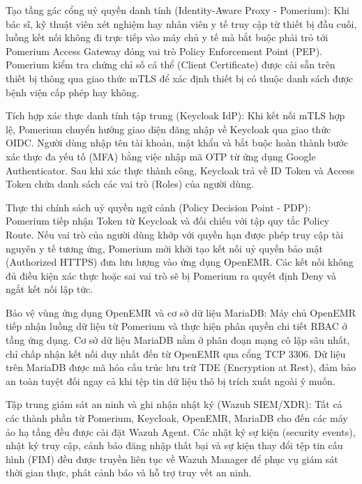 Tạo tầng gác cổng uỷ quyền danh tính (Identity-Aware Proxy - Pomerium): Khi bác sĩ, kỹ thuật viên xét nghiệm hay nhân viên y tế truy cập từ thiết bị đầu cuối, luồng kết nối không đi trực tiếp vào máy chủ y tế mà bắt buộc phải trỏ tới Pomerium Access Gateway đóng vai trò Policy Enforcement Point (PEP). Pomerium kiểm tra chứng chỉ số cá thể (Client Certificate) được cài sẵn trên thiết bị thông qua giao thức mTLS để xác định thiết bị có thuộc danh sách được bệnh viện cấp phép hay không.

Tích hợp xác thực danh tính tập trung (Keycloak IdP): Khi kết nối mTLS hợp lệ, Pomerium chuyển hướng giao diện đăng nhập về Keycloak qua giao thức OIDC. Người dùng nhập tên tài khoản, mật khẩu và bắt buộc hoàn thành bước xác thực đa yếu tố (MFA) bằng việc nhập mã OTP từ ứng dụng Google Authenticator. Sau khi xác thực thành công, Keycloak trả về ID Token và Access Token chứa danh sách các vai trò (Roles) của người dùng.

Thực thi chính sách uỷ quyền ngữ cảnh (Policy Decision Point - PDP): Pomerium tiếp nhận Token từ Keycloak và đối chiếu với tập quy tắc Policy Route. Nếu vai trò của người dùng khớp với quyền hạn được phép truy cập tài nguyên y tế tương ứng, Pomerium mới khởi tạo kết nối uỷ quyền bảo mật (Authorized HTTPS) đưa lưu lượng vào ứng dụng OpenEMR. Các kết nối không đủ điều kiện xác thực hoặc sai vai trò sẽ bị Pomerium ra quyết định Deny và ngắt kết nối lập tức.

Bảo vệ vùng ứng dụng OpenEMR và cơ sở dữ liệu MariaDB: Máy chủ OpenEMR tiếp nhận luồng dữ liệu từ Pomerium và thực hiện phân quyền chi tiết RBAC ở tầng ứng dụng. Cơ sở dữ liệu MariaDB nằm ở phân đoạn mạng cô lập sâu nhất, chỉ chấp nhận kết nối duy nhất đến từ OpenEMR qua cổng TCP 3306. Dữ liệu trên MariaDB được mã hóa cấu trúc lưu trữ TDE (Encryption at Rest), đảm bảo an toàn tuyệt đối ngay cả khi tệp tin dữ liệu thô bị trích xuất ngoài ý muốn.

Tập trung giám sát an ninh và ghi nhận nhật ký (Wazuh SIEM/XDR): Tất cả các thành phần từ Pomerium, Keycloak, OpenEMR, MariaDB cho đến các máy ảo hạ tầng đều được cài đặt Wazuh Agent. Các nhật ký sự kiện (security events), nhật ký truy cập, cảnh báo đăng nhập thất bại và sự kiện thay đổi tệp tin cấu hình (FIM) đều được truyền liên tục về Wazuh Manager để phục vụ giám sát thời gian thực, phát cảnh báo và hỗ trợ truy vết an ninh.

